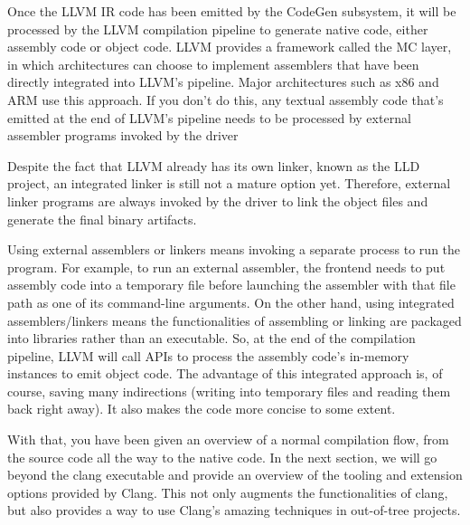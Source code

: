 
Once the LLVM IR code has been emitted by the CodeGen subsystem, it will be processed by the LLVM compilation pipeline to generate native code, either assembly code or object code. LLVM provides a framework called the MC layer, in which architectures can choose to implement assemblers that have been directly integrated into LLVM's pipeline. Major architectures such as x86 and ARM use this approach. If you don't do this, any textual assembly code that's emitted at the end of LLVM's pipeline needs to be processed by external assembler programs invoked by the driver

Despite the fact that LLVM already has its own linker, known as the LLD project, an integrated linker is still not a mature option yet. Therefore, external linker programs are always invoked by the driver to link the object files and generate the final binary artifacts.

\begin{tcolorbox}[colback=blue!5!white,colframe=blue!75!black, fonttitle=\bfseries,title=External versus integrated]
\hspace*{0.7cm}Using external assemblers or linkers means invoking a separate process to run the program. For example, to run an external assembler, the frontend needs to put assembly code into a temporary file before launching the assembler with that file path as one of its command-line arguments. On the other hand, using integrated assemblers/linkers means the functionalities of assembling or linking are packaged into libraries rather than an executable. So, at the end of the compilation pipeline, LLVM will call APIs to process the assembly code's in-memory instances to emit object code. The advantage of this integrated approach is, of course, saving many indirections (writing into temporary files and reading them back right away). It also makes the code more concise to some extent.
\end{tcolorbox}

With that, you have been given an overview of a normal compilation flow, from the source code all the way to the native code. In the next section, we will go beyond the clang executable and provide an overview of the tooling and extension options provided by Clang. This not only augments the functionalities of clang, but also provides a way to use Clang's amazing techniques in out-of-tree projects.





























